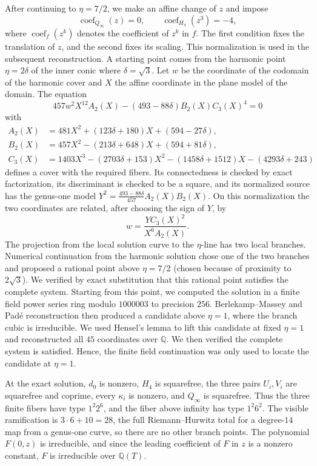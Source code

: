\documentclass[10pt]{amsart}
\numberwithin{equation}{section}
\theoremstyle{definition}
\theoremstyle{remark}
\newcommand{\Q}{\mathbb{Q}}
\begin{document}
  After continuing to $\eta=7/2$, we make an affine change of $z$ and impose
  \[
   \operatorname{coef}_{Q_\infty}(z)=0,\qquad
   \operatorname{coef}_{H_4}(z^3)=-4,
  \]
  where $\operatorname{coef}_f(z^k)$ denotes the coefficient of $z^k$ in $f$.
  The first condition fixes the translation of $z$, and the second fixes its
  scaling.  This normalization is used in the subsequent reconstruction.
A starting point comes from the harmonic point $\eta=2\delta$ of the inner conic where
$\delta=\sqrt3$.  Let $w$ be the coordinate  of the codomain of the harmonic cover and $X$ the affine
coordinate in the plane model of the domain. The equation
\[
 457w^2X^{12}A_2(X)-(493-88\delta)B_2(X)C_3(X)^4=0
\]
with
\[
\begin{aligned}
 A_2(X)&=481X^2+(123\delta+180)X+(594-27\delta),\\
 B_2(X)&=457X^2-(213\delta+648)X+(594+81\delta),\\
 C_3(X)&=1403X^3-(2703\delta+153)X^2-(1458\delta+1512)X-(4293\delta+243)
\end{aligned}
\]
defines a cover with the required fibers. Its connectedness is checked by
exact factorization, its discriminant is checked to be a square, and its
normalized source has the genus-one model
$Y^2=\frac{493-88\delta}{457}A_2(X)B_2(X)$.  On this normalization the two
coordinates are related, after choosing the sign of $Y$, by
\[
 w=\frac{Y C_3(X)^2}{X^6A_2(X)}.
\]
The projection from the local solution curve to the $\eta$-line has two local branches. Numerical continuation from the harmonic solution chose one of the two branches and
  proposed a rational point above $\eta=7/2$ (chosen because of proximity to $2\sqrt{3}$). We verified by exact substitution that this rational point satisfies the complete system.
  Starting from this point, we computed the solution in a finite field power series ring modulo $1000003$ to precision $256$.  Berlekamp--Massey and Pad\'e reconstruction then
  produced a candidate above $\eta=1$, where the branch cubic is irreducible.  We used Hensel's lemma to lift this candidate at fixed $\eta=1$ and reconstructed all $45$
  coordinates over $\Q$.  We then verified the complete system is satisfied. Hence, the finite field continuation was only used to locate the candidate at $\eta=1$.
  

At the exact solution, $d_0$ is nonzero, $H_4$ is squarefree, the three
pairs $U_i,V_i$ are squarefree and coprime, every $\kappa_i$ is nonzero,
and $Q_\infty$ is squarefree.  Thus
the three finite fibers have type $1^2 2^6$, and the fiber above infinity
has type $1^2 6^2$. The visible ramification is
$3\cdot6+10=28$, the full Riemann--Hurwitz total for a degree-$14$ map from
a genus-one curve, so there are no other branch points. The polynomial $F(0,z)$ is
irreducible, and since the leading coefficient of $F$ in $z$ is a nonzero
constant, $F$ is irreducible over $\Q(T)$.
\end{document}
